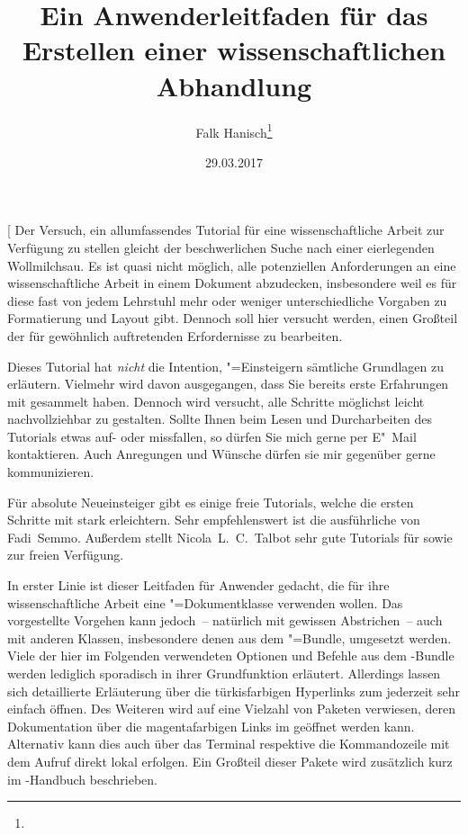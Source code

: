 \documentclass[%
  english,ngerman,%
  cdgeometry=no,DIV=12,automark%
]{tudscrartcl}
\begin{document}
\date{29.03.2017}
\author{Falk Hanisch\thanks{\noexpand\scriptsize\noexpand\mailto{\tudscrmail}}}
\title{%
  Ein Anwenderleitfaden für das Erstellen einer wissenschaftlichen Abhandlung%
}
\makeatletter
\begingroup%
  \def\and{, }%
  \let\thanks\@gobble%
  \let\footnote\@gobble%
\endgroup%
\makeatother
\StartTutorial[%
  Der Versuch, ein allumfassendes Tutorial für eine wissenschaftliche Arbeit 
  zur Verfügung zu stellen gleicht der beschwerlichen Suche nach einer 
  eierlegenden Wollmilchsau. Es ist quasi nicht möglich, alle potenziellen 
  Anforderungen an eine wissenschaftliche Arbeit in einem Dokument abzudecken, 
  insbesondere weil es für diese fast von jedem Lehrstuhl mehr oder weniger 
  unterschiedliche Vorgaben zu Formatierung und Layout gibt. Dennoch soll hier 
  versucht werden, einen Großteil der für gewöhnlich auftretenden Erfordernisse
  zu bearbeiten.
  
  Dieses Tutorial hat \emph{nicht} die Intention, "=Einsteigern 
  sämtliche Grundlagen zu erläutern. Vielmehr wird davon ausgegangen, dass Sie 
  bereits erste Erfahrungen mit  gesammelt haben. Dennoch wird 
  versucht, alle Schritte möglichst leicht nachvollziehbar zu gestalten. Sollte 
  Ihnen beim Lesen und Durcharbeiten des Tutorials etwas auf- oder missfallen, 
  so dürfen Sie mich gerne per E"~Mail kontaktieren. Auch Anregungen und 
  Wünsche dürfen sie mir gegenüber gerne kommunizieren.
  
  Für absolute Neueinsteiger gibt es einige freie Tutorials, welche die ersten 
  Schritte mit  stark erleichtern. Sehr empfehlenswert ist die 
  ausführliche  
  von Fadi~Semmo. Außerdem stellt Nicola~L.~C.~Talbot sehr gute Tutorials für 
  \cite{talbot2012} sowie 
  \cite{talbot2013} zur freien Verfügung.
  
  In erster Linie ist dieser Leitfaden für Anwender gedacht, die für ihre
  wissenschaftliche Arbeit eine \TUDScript"=Dokumentklasse verwenden wollen. 
  Das vorgestellte Vorgehen kann jedoch~-- natürlich mit gewissen Abstrichen~-- 
  auch mit anderen Klassen, insbesondere denen aus dem \KOMAScript"=Bundle, 
  umgesetzt werden. Viele der hier im Folgenden verwendeten Optionen und
  Befehle aus dem \TUDScript-Bundle werden lediglich sporadisch in ihrer 
  Grundfunktion erläutert. Allerdings lassen sich detaillierte Erläuterung über 
  die türkisfarbigen Hyperlinks zum   
  jederzeit sehr einfach öffnen. Des Weiteren wird auf eine Vielzahl von 
  Paketen verwiesen, deren Dokumentation über die magentafarbigen Links im 
  \CTAN* geöffnet werden kann. Alternativ kann dies auch über das Terminal 
  respektive die Kommandozeile mit dem Aufruf  
  direkt lokal erfolgen. Ein Großteil dieser Pakete wird zusätzlich kurz im 
  \TUDScript-Handbuch beschrieben.
  
\end{document}
